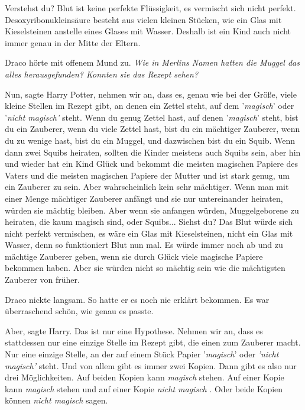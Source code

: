 Verstehst du? Blut ist keine perfekte Flüssigkeit, es vermischt sich nicht
perfekt. Desoxyribonukleinsäure besteht aus vielen kleinen Stücken, wie ein Glas
mit Kieselsteinen anstelle eines Glases mit Wasser. Deshalb ist ein Kind auch
nicht immer genau in der Mitte der Eltern.\grqq{}

Draco hörte mit offenem Mund zu. \emph{Wie in Merlins Namen hatten die Muggel
das alles herausgefunden? Konnten sie das Rezept sehen?}

\glqq Nun\grqq{}, sagte Harry Potter, \glqq nehmen wir an, dass es, genau wie
bei der Größe, viele kleine Stellen im Rezept gibt, an denen ein Zettel steht,
auf dem '\emph{magisch}' oder '\emph{nicht magisch'} steht. Wenn du genug Zettel
hast, auf denen '\emph{magisch}' steht, bist du ein Zauberer, wenn du viele
Zettel hast, bist du ein mächtiger Zauberer, wenn du zu wenige hast, bist du ein
Muggel, und dazwischen bist du ein Squib. Wenn dann zwei Squibs heiraten,
sollten die Kinder meistens auch Squibs sein, aber hin und wieder hat ein Kind
Glück und bekommt die meisten magischen Papiere des Vaters und die meisten
magischen Papiere der Mutter und ist stark genug, um ein Zauberer zu sein. Aber
wahrscheinlich kein sehr mächtiger. Wenn man mit einer Menge mächtiger Zauberer
anfängt und sie nur untereinander heiraten, würden sie mächtig bleiben. Aber
wenn sie anfangen würden, Muggelgeborene zu heiraten, die kaum magisch sind,
oder Squibs... Siehst du? Das Blut würde sich nicht perfekt vermischen, es wäre
ein Glas mit Kieselsteinen, nicht ein Glas mit Wasser, denn so funktioniert Blut
nun mal. Es würde immer noch ab und zu mächtige Zauberer geben, wenn sie durch
Glück viele magische Papiere bekommen haben. Aber sie würden nicht so mächtig
sein wie die mächtigsten Zauberer von früher.\grqq{}

Draco nickte langsam. So hatte er es noch nie erklärt bekommen. Es war
überraschend schön, wie genau es passte.

\glqq Aber\grqq{}, sagte Harry. \glqq Das ist nur eine Hypothese. Nehmen wir an,
dass es stattdessen nur eine einzige Stelle im Rezept gibt, die einen zum
Zauberer macht. Nur eine einzige Stelle, an der auf einem Stück Papier
'\emph{magisch}' oder \emph{'nicht magisch'} steht. Und von allem gibt es immer
zwei Kopien. Dann gibt es also nur drei Möglichkeiten. Auf beiden Kopien kann
\glqq \emph{magisch}\grqq{} stehen. Auf einer Kopie kann \glqq
\emph{magisch}\grqq{} stehen und auf einer Kopie \glqq \emph{nicht
magisch\grqq{} }. Oder beide Kopien können \emph{\glqq nicht magisch\grqq{} }
sagen.

